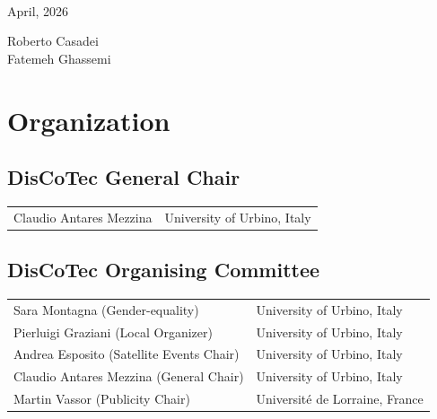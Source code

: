 \documentclass[]{llncs}
\begin{document}



~\bigskip

\noindent
\begin{minipage}[t]{.4\textwidth}
April, 2026\\
\end{minipage}%
\hfill
\begin{minipage}[t]{.4\textwidth}\flushright
Roberto Casadei\\
Fatemeh Ghassemi
\end{minipage}


%

\clearpage


\chapter*{Organization}
\setlength{\tabcolsep}{0pt}     %
\setlength{\LTpre}{0pt}         %

\section*{DisCoTec General Chair}
\begin{longtable}{p{}p{}}
Claudio Antares Mezzina          & University of Urbino, Italy
\end{longtable}

\section*{DisCoTec Organising Committee}
\begin{longtable}{p{}p{}}
Sara Montagna (Gender-equality) & University of Urbino, Italy\\
Pierluigi Graziani (Local Organizer) & University of Urbino, Italy\\
Andrea Esposito (Satellite Events Chair) & University of Urbino, Italy\\
Claudio Antares Mezzina (General Chair) & University of Urbino, Italy
\\
Martin Vassor (Publicity Chair) & Universit\'e de Lorraine, France
\end{longtable}
\end{document}
